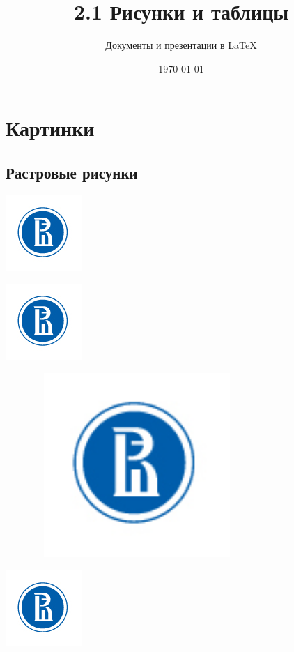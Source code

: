 \documentclass[a4paper,12pt]{article}
\author{Документы и презентации в \LaTeX}
\title{2.1 Рисунки и таблицы}
\date{\today}
\begin{document}

\maketitle

\section{Картинки}

\subsection{Растровые рисунки}

\includegraphics{znak.jpg}

\includegraphics[scale=2]{znak.jpg}

\includegraphics[width=10cm,height=7cm,keepaspectratio]{znak.jpg}

\includegraphics[draft]{znak.jpg}
\end{document}
